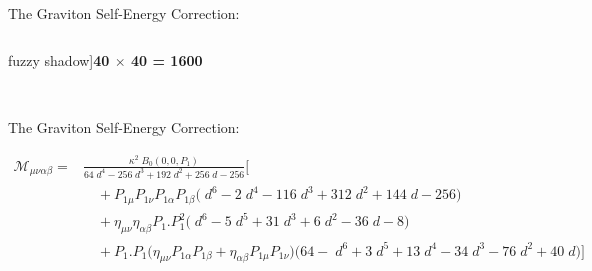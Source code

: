 \documentclass[aspectratio=169,usenames,dvipsnames]{beamer}
\begin{document}
\begin{frame}{\centering {}\\
    \small The Graviton Self-Energy Correction:}
{\begin{columns}
\begin{column}{0.3\textwidth}
  fuzzy shadow]{\bfseries 40 $\times$ 40 = 1600}    
  \end{column}
  \begin{column}{0.4\textwidth}
  \end{column}
  \begin{column}{0.3\textwidth}
  \centering{}    
  \end{column}
\end{columns}}

\vspace{100mm}
\end{frame}


\begin{frame}{\centering {}\\
    \small The Graviton Self-Energy Correction:} \footnotesize
{}
\vspace{0.001mm}
\centering
\begin{figure}
	\centering
\end{figure}
\noindent\begin{tcolorbox}[enhanced,width=\textwidth,colframe=LUCopper,arc=4pt,boxrule=1pt,drop
  fuzzy shadow]
\setlength{\belowdisplayskip}{0pt}
\setlength{\abovedisplayskip}{0pt}
\tiny\begin{align*}
  \mathcal{M}_{\mu\nu\alpha\beta} = &  
        \frac{\kappa^2 \; B_0(0,0,P_1)}{64 \; d^4 - 256 \; d^3 + 192 \; d^2 + 256 \; d - 256} \Big  [  \\
& \quad        + P_{1\mu} P_{1\nu} P_{1\alpha} P_{1\beta}  \big (\; d^6 - 2 \; d^4 - 116 \; d^3 + 
         312 \; d^2 + 144 \; d - 256 \big )  \\
& \quad         + \eta_{\mu\nu} \eta_{\alpha\beta} P_1.P_1^2  \big (\; d^6 - 5 \; d^5 + 31 \; d^3 + 6
          \; d^2 - 36 \; d - 8 \big ) \\
&  \quad        + P_1.P_1 \big ( \eta_{\mu\nu} P_{1\alpha} P_{1\beta}  +\eta_{\alpha\beta} P_{1\mu} P_{1\nu}  \big )  \big ( 64 - \; d^6 + 3 \; d^5 + 13 \; d^4 - 34 \; d^3 - 76 \; d^2 + 40 \; d  \big )  \Big ] \\

\end{align*}
\end{tcolorbox}
\end{frame}
\end{document}
